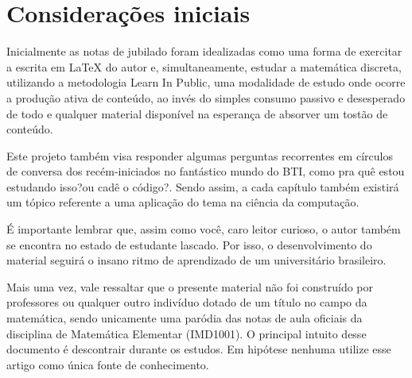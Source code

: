 \section*{Considerações iniciais}

Inicialmente as notas de jubilado foram idealizadas como uma forma de exercitar a escrita em LaTeX do autor e, simultaneamente, estudar a matemática discreta, utilizando a metodologia \abreaspas Learn In Public\fechaaspas, uma modalidade de estudo onde ocorre a produção ativa de conteúdo, ao invés do simples consumo passivo e desesperado de todo e qualquer material disponível na esperança de absorver um tostão de conteúdo.  

Este projeto também visa responder algumas perguntas recorrentes em círculos de conversa dos recém-iniciados no fantástico mundo do BTI, como \abreaspas pra quê estou estudando isso?\fechaaspas ou \abreaspas cadê o código?\fechaaspas. Sendo assim, a cada capítulo também existirá um tópico referente a uma aplicação do tema na ciência da computação.

É importante lembrar que, assim como você, caro leitor curioso, o autor também se encontra no estado de \abreaspas estudante lascado\fechaaspas. Por isso, o desenvolvimento do material seguirá o insano ritmo de aprendizado de um universitário brasileiro.

Mais uma vez, vale ressaltar que o presente material não foi construído por professores ou qualquer outro indivíduo dotado de um título no campo da matemática, sendo unicamente uma paródia das notas de aula oficiais da disciplina de Matemática Elementar (IMD1001). O principal intuito desse documento é descontrair durante os estudos. Em hipótese nenhuma utilize esse artigo como única fonte de conhecimento.